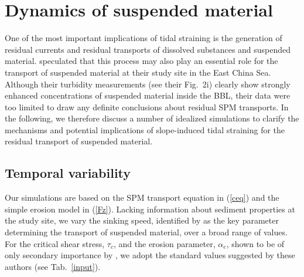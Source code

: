 \section{Dynamics of suspended material} \label{residuals}

One of the most important implications of tidal straining is the
generation of residual currents and residual transports of dissolved
substances and suspended material. \cite{Endohetal2016a} speculated
that this process may also play an essential role for the transport of
suspended material at their study site in the East China Sea. Although
their turbidity measurements (see their Fig.\ 2i) clearly show
strongly enhanced concentrations of suspended material inside the BBL,
their data were too limited to draw any definite conclusions about
residual SPM transports. In the following, we therefore discuss a
number of idealized simulations to clarify the mechanisms and
potential implications of slope-induced tidal straining for the
residual transport of suspended material.

\subsection{Temporal variability}\label{temporal}

Our simulations are based on the SPM transport equation in (\ref{ceq})
and the simple erosion model in (\ref{Fz}). Lacking information about
sediment properties at the study site, we vary the sinking speed,
identified by \cite{schulzumlauf2016} as the key parameter
determining the transport of suspended material, over a broad range of
values. For the critical shear stress, $\tau_c$, and the erosion
parameter, $\alpha_e$, shown to be of only secondary importance by
\cite{schulzumlauf2016}, we adopt the standard values suggested by
these authors (see Tab.\ \ref{input}).

